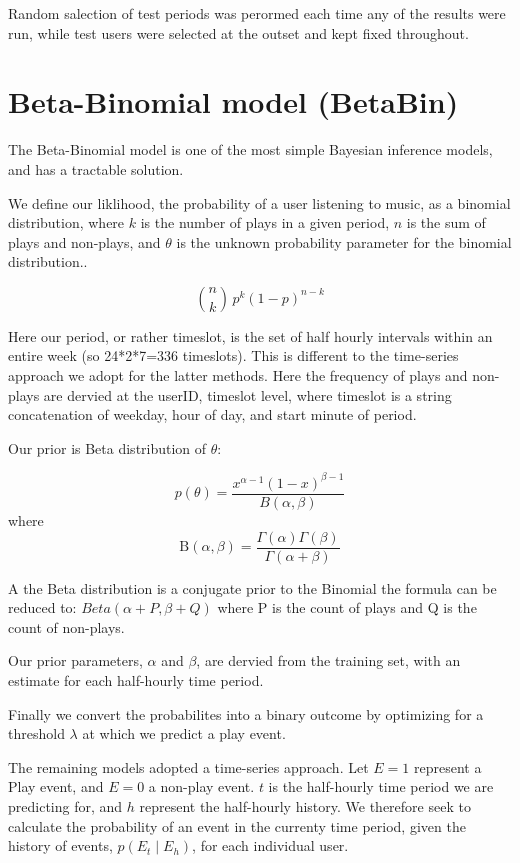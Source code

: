 Random salection of test periods was perormed each time any of the results were run, while test users were selected at the outset and kept fixed throughout.
 
\section{Beta-Binomial model (BetaBin)}

The Beta-Binomial model is one of the most simple Bayesian inference models, and has a tractable solution.

We define our liklihood, the probability of a user listening to music, as a binomial distribution, where $k$ is the number of plays in a given period, $n$ is the sum of plays and non-plays, and $\theta$ is the unknown probability parameter for the binomial distribution.. 

$${n \choose k}\,p^{k}(1-p)^{n-k}$$

Here our period, or rather timeslot, is the set of half hourly intervals within an entire week (so 24*2*7=336 timeslots). This is different to the time-series approach we adopt for the latter methods. Here the frequency of plays and non-plays are dervied at the userID, timeslot level, where timeslot is a string concatenation of weekday, hour of day, and start minute of period. 

Our prior is Beta distribution of $\theta$:

$$p(\theta)=\frac{x^{\alpha-1}(1-x)^{\beta-1}} {B(\alpha,\beta)}$$ where
$$\mathrm {B} (\alpha ,\beta )={\frac {\Gamma (\alpha )\Gamma (\beta )}{\Gamma (\alpha +\beta )}}$$

A the Beta distribution is a conjugate prior to the Binomial the formula can be reduced to: $Beta(\alpha+P, \beta+Q)$ where P is the count of plays and Q is the count of non-plays.

Our prior parameters, $\alpha$ and $\beta$, are dervied from the training set, with an estimate for each half-hourly time period. 

Finally we convert the probabilites into a binary outcome by optimizing for a threshold $\lambda$ at which we predict a play event.

The remaining models adopted a time-series approach. Let $E = 1$ represent a Play event, and $E = 0$ a non-play event. $t$ is the half-hourly time period we are predicting for, and $h$ represent the half-hourly history. We therefore seek to calculate the probability of an event in the currenty time period, given the history of events, $p(E_t \mid E_h)$, for each individual user. 


